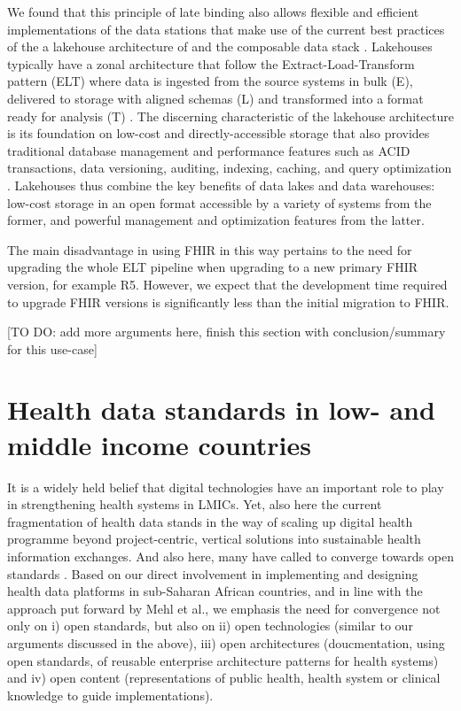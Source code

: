 \documentclass[
  authoryear]{elsarticle}
\begin{document}
We found that this principle of late binding also allows flexible and
efficient implementations of the data stations that make use of the
current best practices of the a lakehouse architecture of
\citep{hai2023data, harby2022data, harby2024data} and the composable
data stack \citep{pedreira2023composable}. Lakehouses typically have a
zonal architecture that follow the Extract-Load-Transform pattern (ELT)
where data is ingested from the source systems in bulk (E), delivered to
storage with aligned schemas (L) and transformed into a format ready for
analysis (T) \citep{hai2023data}. The discerning characteristic of the
lakehouse architecture is its foundation on low-cost and
directly-accessible storage that also provides traditional database
management and performance features such as ACID transactions, data
versioning, auditing, indexing, caching, and query optimization
\citep{armbrust2021lakehouse}. Lakehouses thus combine the key benefits
of data lakes and data warehouses: low-cost storage in an open format
accessible by a variety of systems from the former, and powerful
management and optimization features from the latter.

The main disadvantage in using FHIR in this way pertains to the need for
upgrading the whole ELT pipeline when upgrading to a new primary FHIR
version, for example R5. However, we expect that the development time
required to upgrade FHIR versions is significantly less than the initial
migration to FHIR.

{[}TO DO: add more arguments here, finish this section with
conclusion/summary for this use-case{]}

\section{Health data standards in low- and middle income
countries}\label{health-data-standards-in-low--and-middle-income-countries}

It is a widely held belief that digital technologies have an important
role to play in strengthening health systems in LMICs. Yet, also here
the current fragmentation of health data stands in the way of scaling up
digital health programme beyond project-centric, vertical solutions into
sustainable health information exchanges. And also here, many have
called to converge towards open standards \citep{mehl2023fullstac}.
Based on our direct involvement in implementing and designing health
data platforms in sub-Saharan African countries, and in line with the
approach put forward by Mehl et al., we emphasis the need for
convergence not only on i) open standards, but also on ii) open
technologies (similar to our arguments discussed in the above), iii)
open architectures (doucmentation, using open standards, of reusable
enterprise architecture patterns for health systems) and iv) open
content (representations of public health, health system or clinical
knowledge to guide implementations).
\end{document}
